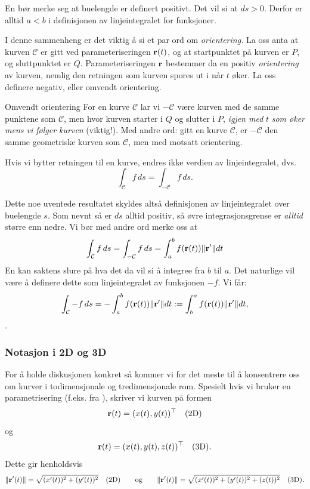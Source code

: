 \begin{rem}{}
En bør merke seg at buelengde er definert positivt. Det vil si at $ds>0.$ Derfor er alltid $a<b$ i definisjonen av linjeintegralet for funksjoner.
\end{rem}
I denne sammenheng er det viktig å si et par ord om \textit{orientering.}
La oss anta at kurven \( \mathcal{C} \) er gitt ved parameteriseringen $\mathbf{r}(t)$, og at startpunktet på kurven er \( P \), og sluttpunktet er \( Q \).
Parameteriseringen \( \mathbf{r} \) bestemmer da en positiv \emph{orientering} av kurven, nemlig den retningen som kurven spores ut i når \( t \) øker.
La oss definere negativ, eller omvendt orientering.
\begin{defn}{Omvendt orientering}
\label{omvendt_orient}
For en kurve $\mathcal{C}$ lar vi \( -\mathcal{C} \) være kurven med de samme punktene som \( \mathcal{C} \), men hvor kurven starter i \( Q \) og slutter i \( P \), \textit{igjen med} \( t \) \textit{som øker mens vi følger kurven} (viktig!). Med andre ord: gitt en kurve \( \mathcal{C} \), er \( -\mathcal{C} \) den samme geometriske kurven som \( \mathcal{C} \), men med motsatt orientering. 
\end{defn}
Hvis vi bytter retningen til en kurve, endres ikke verdien av linjeintegralet, dvs.
\[ \int_\mathcal{C} f\, ds = \int_{-\mathcal{C}} f\, ds.\]
\begin{rem}{}
Dette noe uventede resultatet skyldes altså definisjonen av linjeintegralet over buelengde $s$. Som nevnt så er $ds$ alltid positiv, så øvre integrasjonsgrense er \textit{alltid} større enn nedre. Vi bør med andre ord merke oss at 
\[\int_\mathcal{C} f\, ds=\int_{-\mathcal{C}} f\, ds=\int_a^bf(\mathbf{r}(t))\|\mathbf{r}^\prime\|dt\]
En kan saktens slure på hva det da vil si å integree fra $b$ til $a.$ Det naturlige vil være å definere dette som linjeintegralet av funksjonen $-f$. Vi får:
\[\int_\mathcal{C} -f\, ds=-\int_a^bf(\mathbf{r}(t))\|\mathbf{r}^\prime\|dt:=\int_b^af(\mathbf{r}(t))\|\mathbf{r}^\prime\|dt,\]. 
\end{rem}

\subsubsection{Notasjon i 2D og 3D}
For å holde diskusjonen konkret så kommer vi for det meste til å konsentrere oss om kurver i todimensjonale og tredimensjonale rom. Spesielt hvis vi bruker en parametrisering (f.eks. fra ), skriver vi kurven på formen \[\mathbf{r}(t) = (x(t),y(t))^\top\quad\textrm{(2D)}\] og \[\mathbf{r}(t) = (x(t),y(t),z(t))^\top\quad\textrm{(3D)}.\] Dette gir henholdsvis  
\[\lVert \mathbf{r}'(t)\rVert = \sqrt{(x'(t))^2+(y'(t))^2}\quad\text{(2D)}\qquad\textrm{og}\qquad\lVert \mathbf{r}'(t)\rVert = \sqrt{(x'(t))^2+(y'(t))^2+(z(t))^2}\quad\text{(3D)}.\]

